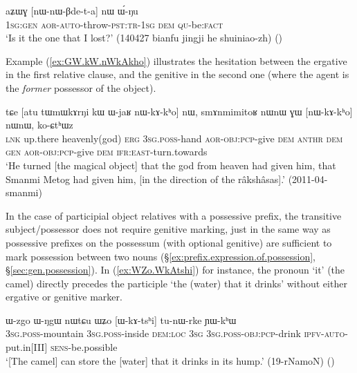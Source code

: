  \begin{exe}
\ex \label{ex:aZWG.nWnWBeta}
 \gll aʑɯɣ [nɯ-nɯ-βde-t-a] nɯ ɯ́-ŋu \\
 \textsc{1sg}:\textsc{gen} \textsc{aor}-\textsc{auto}-throw-\textsc{pst}:\textsc{tr}-\textsc{1sg} \textsc{dem} \textsc{qu}-be:\textsc{fact} \\
 \glt `Is it the one that I lost?' (140427 bianfu jingji he shuiniao-zh)
 ()
\end{exe}

Example (\ref{ex:GW.kW.nWkAkho}) illustrates the hesitation between the ergative in the first relative clause, and the genitive in the second one (where the agent is the \textit{former} possessor of the object).

\begin{exe}
\ex \label{ex:GW.kW.nWkAkho}
 \gll tɕe [atu tɯmɯkɤrŋi kɯ ɯ-jaʁ nɯ-kɤ-kʰo] nɯ, smɤnmimitoʁ nɯnɯ ɣɯ [nɯ-kɤ-kʰo] nɯnɯ, ko-ɕtʰɯz\\
\textsc{lnk} up.there heavenly(god) \textsc{erg} \textsc{3sg}.\textsc{poss}-hand \textsc{aor}-\textsc{obj}:\textsc{pcp}-give \textsc{dem}  \textsc{anthr} \textsc{dem} \textsc{gen} \textsc{aor}-\textsc{obj}:\textsc{pcp}-give \textsc{dem} \textsc{ifr}:\textsc{east}-turn.towards\\
\glt `He turned [the magical object] that the god from heaven had given him, that Smanmi Metog had given him, [in the direction of the râkshâsas].' (2011-04-smanmi)
\end{exe}

In the case of participial object relatives with a possessive prefix, the transitive subject/possessor does not require genitive marking, just in the same way as possessive prefixes on the possessum (with optional genitive) are sufficient to mark possession between two nouns (§\ref{ex:prefix.expression.of.possession}, §\ref{sec:gen.possession}). In (\ref{ex:WZo.WkAtshi}) for instance, the pronoun  `it' (the camel) directly precedes the participle  `the (water) that it drinks' without either ergative or genitive marker.

\begin{exe}
\ex \label{ex:WZo.WkAtshi}
 \gll ɯ-zgo ɯ-ŋgɯ nɯtɕu ɯʑo [ɯ-kɤ-tsʰi] tu-nɯ-rke ɲɯ-kʰɯ \\
\textsc{3sg}.\textsc{poss}-mountain \textsc{3sg}.\textsc{poss}-inside \textsc{dem}:\textsc{loc} \textsc{3sg} \textsc{3sg}.\textsc{poss}-\textsc{obj}:\textsc{pcp}-drink \textsc{ipfv}-\textsc{auto}-put.in[III] \textsc{sens}-be.possible \\
\glt `[The camel] can store the [water] that it drinks in its hump.' (19-rNamoN)
()
\end{exe}


